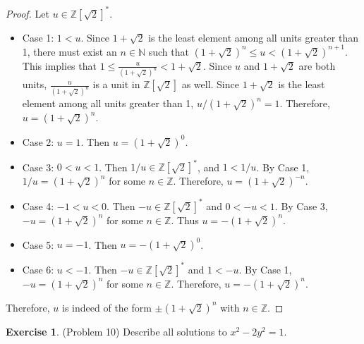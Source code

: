 \documentclass[12pt, psamsfonts]{amsart}
\theoremstyle{definition}
\newtheorem*{exer}{Exercise}
\theoremstyle{remark}
\numberwithin{equation}{section}
\begin{document}
\begin{proof}
  Let $u \in \mathbb{Z}[\sqrt{2}]^*$.
  \begin{itemize}
    \item
      Case 1: $1 < u$.
      Since $1 + \sqrt{2}$ is the least element among all units greater than 1, there must exist an $n \in \mathbb{N}$ such that $(1 + \sqrt{2})^n \leq u < (1 + \sqrt{2})^{n + 1}$.
      This implies that $1 \leq \frac{u}{(1 + \sqrt{2})^n} < 1 + \sqrt{2}$.
      Since $u$ and $1 + \sqrt{2}$ are both units, $\frac{u}{(1 + \sqrt{2})^n}$ is a unit in $\mathbb{Z}[\sqrt{2}]$ as well.
      Since $1 + \sqrt{2}$ is the least element among all units greater than 1, $u / (1 + \sqrt{2})^n = 1$.
      Therefore, $u = (1 + \sqrt{2})^n$.
    \item
      Case 2: $u = 1$.
      Then $u = (1 + \sqrt{2})^0$.
    \item
      Case 3: $0 < u < 1$.
      Then $1 / u \in \mathbb{Z}[\sqrt{2}]^*$, and $1 < 1 / u$.
      By Case 1, $1 / u = (1 + \sqrt{2})^n$ for some $n \in \mathbb{Z}$.
      Therefore, $u = (1 + \sqrt{2})^{-n}$.
    \item
      Case 4: $-1 < u < 0$.
      Then $-u \in \mathbb{Z}[\sqrt{2}]^*$ and $0 < -u < 1$.
      By Case 3, $-u = (1 + \sqrt{2})^{n}$ for some $n \in \mathbb{Z}$.
      Thus $u = -(1 + \sqrt{2})^n$.
    \item
      Case 5: $u = -1$.
      Then $u = -(1 + \sqrt{2})^0$.
    \item
      Case 6: $u < -1$.
      Then $-u \in \mathbb{Z}[\sqrt{2}]^*$ and $1 < -u$.
      By Case 1, $-u = (1 + \sqrt{2})^n$ for some $n \in \mathbb{Z}$.
      Therefore, $u = -(1 + \sqrt{2})^n$.
  \end{itemize}
  Therefore, $u$ is indeed of the form $\pm(1 + \sqrt{2})^n$ with $n \in \mathbb{Z}$.
\end{proof}

\begin{exer}{(Problem 10)}
  Describe all solutions to $x^2 - 2y^2 = 1$.
\end{exer}
\end{document}
